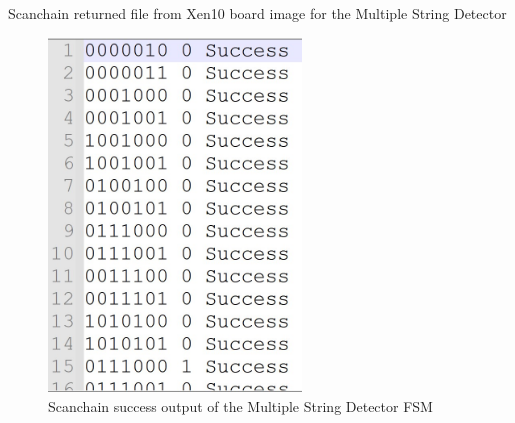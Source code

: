 \documentclass[12pt]{article}
\begin{document}
	\pagebreak
	Scanchain returned file from Xen10 board image for the Multiple String Detector
	\begin{figure}[H]
	  \centering
	  \includegraphics[width=0.6\textwidth]{figs/strdet_scan.JPG}  %
	  \caption{Scanchain success output of the Multiple String Detector FSM}
	  \label{fig:strdet_scan}
	  
	\end{figure}
	
\end{document}
